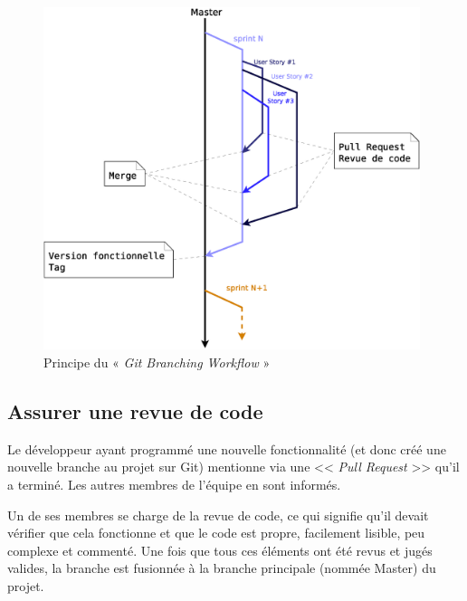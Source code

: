 \documentclass[12pt,a4paper,openany]{article}
\begin{document}
	\begin{figure}[H]
		\centering
		\includegraphics[width=11cm]{BranchingWorkflow.eps}
		\caption{Principe du « \textit{Git Branching Workflow} »}
	\end{figure}
	\subsection{Assurer une revue de code}
	    Le développeur ayant programmé une nouvelle fonctionnalité (et donc créé une nouvelle branche au projet sur Git) mentionne via une <<
		\textit{Pull Request} >> qu'il a terminé.  Les autres membres de l'équipe en sont informés. 
		
		Un de ses membres se charge de la revue de code, ce qui signifie
		qu'il devait vérifier que cela fonctionne et que le code est propre, facilement lisible, peu complexe et commenté. Une fois que tous ces
		éléments ont été revus et jugés valides, la branche est fusionnée à la branche principale (nommée Master) du projet. 
\end{document}
